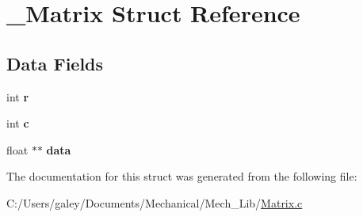 \hypertarget{struct___matrix}{}\section{\+\_\+\+Matrix Struct Reference}
\label{struct___matrix}
\subsection*{Data Fields}
\begin{DoxyCompactItemize}
\item 
\mbox{\label{struct___matrix_acab531abaa74a7e664e3986f2522b33a}} 
int {\bfseries r}
\item 
\mbox{\label{struct___matrix_a4e1e0e72dd773439e333c84dd762a9c3}} 
int {\bfseries c}
\item 
\mbox{\label{struct___matrix_a3d4ed54592489fa0d148afe43d50fb09}} 
float $\ast$$\ast$ {\bfseries data}
\end{DoxyCompactItemize}


The documentation for this struct was generated from the following file\+:\begin{DoxyCompactItemize}
\item 
C\+:/\+Users/galey/\+Documents/\+Mechanical/\+Mech\+\_\+\+Lib/\mbox{\hyperlink{_matrix_8c}{Matrix.\+c}}\end{DoxyCompactItemize}
